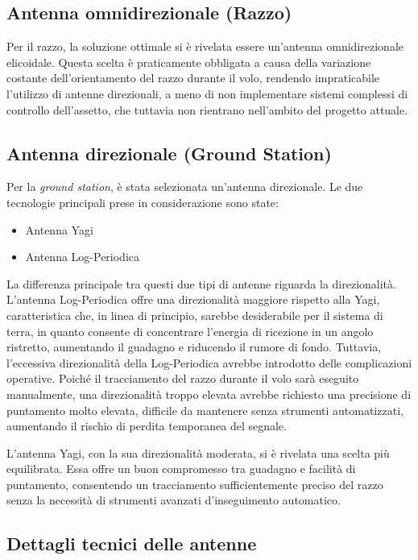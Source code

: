 \documentclass[12pt,a4paper,twoside]{book}
\begin{document}
\subsection*{Antenna omnidirezionale (Razzo)}

Per il razzo, la soluzione ottimale si è rivelata essere un'antenna omnidirezionale
elicoidale.
Questa scelta è praticamente obbligata a causa della variazione costante dell'orientamento
del razzo durante il volo, rendendo impraticabile l'utilizzo di antenne direzionali,
a meno di non implementare sistemi complessi di controllo dell'assetto, che
tuttavia non rientrano nell'ambito del progetto attuale.

\subsection*{Antenna direzionale (Ground Station)}

Per la \emph{ground station}, è stata selezionata un'antenna direzionale. Le due
tecnologie principali prese in considerazione sono state:
\begin{itemize}
    \item Antenna Yagi
    \item Antenna Log-Periodica
\end{itemize}

La differenza principale tra questi due tipi di antenne riguarda la direzionalità.
L'antenna Log-Periodica offre una direzionalità maggiore rispetto alla Yagi,
caratteristica che, in linea di principio, sarebbe desiderabile per il sistema
di terra, in quanto consente di concentrare l'energia di ricezione in un angolo
ristretto, aumentando il guadagno e riducendo il rumore di fondo.
Tuttavia, l'eccessiva direzionalità della Log-Periodica avrebbe introdotto
delle complicazioni operative. Poiché il tracciamento del razzo durante il volo
sarà eseguito manualmente, una direzionalità troppo elevata avrebbe richiesto
una precisione di puntamento molto elevata, difficile da mantenere senza
strumenti automatizzati, aumentando il rischio di perdita temporanea del segnale.

L'antenna Yagi, con la sua direzionalità moderata, si è rivelata una scelta più
equilibrata. Essa offre un buon compromesso tra guadagno e facilità di puntamento,
consentendo un tracciamento sufficientemente preciso del razzo senza la necessità
di strumenti avanzati d'inseguimento automatico.

\subsection*{Dettagli tecnici delle antenne}
\end{document}
